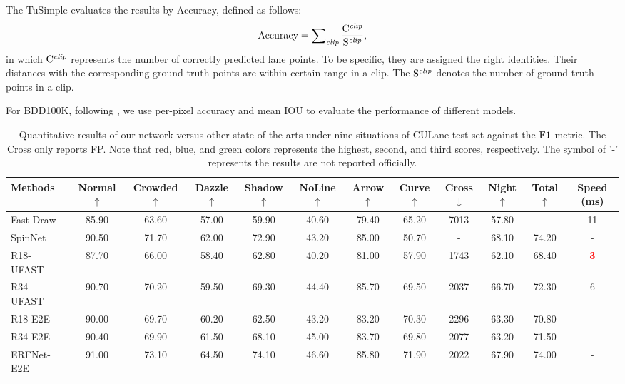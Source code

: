 \documentclass[preprint,12pt,review]{elsarticle}
\begin{document}
The TuSimple evaluates the results by Accuracy, defined as follows:
\begin{equation}
	\rm Accuracy = \sum\nolimits_{\it{clip}}\frac{C^{\it{clip}}}{S^{\it{clip}}},
\end{equation}
in which $\rm C^{\it{clip}}$ represents the number of correctly predicted lane points. To be specific, they are assigned the right identities. Their distances with the corresponding ground truth points are within certain range in a clip. The $\rm S^{\it{clip}}$ denotes the number of ground truth points in a clip.

For BDD100K, following \cite{distillation}, we use per-pixel accuracy and mean IOU to evaluate the performance of different models.
\begin{table*}[htbp]
\centering
	\caption{Quantitative results of our network versus other state of the arts under nine situations of CULane test set against the $\rm F1$ metric. The Cross only reports FP. Note that red, blue, and green colors represents the highest, second, and third scores, respectively. The symbol of '-' represents the results are not reported officially. }
	\resizebox{\textwidth}{!}
	{
		\setlength\tabcolsep{1pt}
		\renewcommand\arraystretch{1.6}
		\begin{tabular}{l||ccccccccc|c|c}
			\toprule[1pt]
			Methods  &Normal $\uparrow$ &Crowded $\uparrow$ &Dazzle $\uparrow$ &Shadow$\uparrow$ &NoLine $\uparrow$ &Arrow$\uparrow$ &Curve$\uparrow$ &Cross$\downarrow$ &Night$\uparrow$ &Total$\uparrow$ &Speed (ms)\\
			\hline
			\hline
			Fast Draw~\cite{fastdraw} &85.90  &63.60 &57.00 &59.90 &40.60 &79.40 &65.20 &7013 &57.80 &- &11 \\
			SpinNet~\cite{spinnet} &90.50 &71.70 &62.00 &72.90 &43.20 &85.00 &50.70 &-  &68.10 &74.20 &-\\
			R18-UFAST~\cite{ufast}&87.70 &66.00 &58.40 &62.80 &40.20 &81.00 &57.90 &1743 &62.10 &68.40 &\textcolor{red}{\bf{3}}\\
			R34-UFAST~\cite{ufast}&90.70 &70.20 &59.50 &69.30 &44.40 &85.70 &69.50 &2037 &66.70 &72.30 &6\\
			R18-E2E~\cite{e2e}&90.00 &69.70 &60.20 &62.50 &43.20 &83.20 &70.30 &2296 &63.30 &70.80 &-\\
			R34-E2E~\cite{e2e} &90.40 &69.90 &61.50 &68.10 &45.00 &83.70 &69.80 &2077 &63.20 &71.50 &-\\
			ERFNet-E2E~\cite{e2e} &91.00 &73.10 &64.50 &74.10 &46.60 &85.80 &71.90 & 2022 &67.90 &74.00&-\\

\end{tabular}}
\end{table*}
\end{document}
